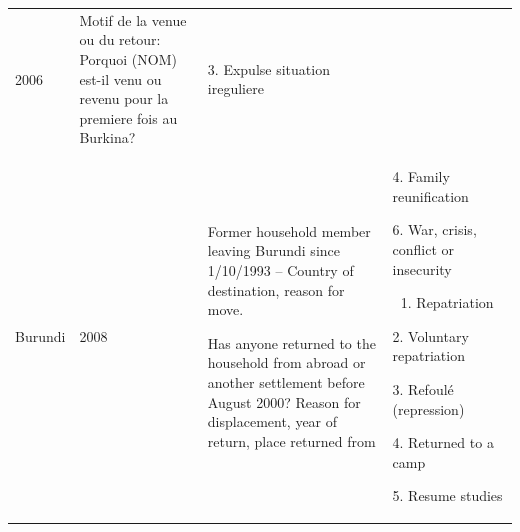 \documentclass[
]{article}
\providecommand{\tightlist}{%
  \setlength{\itemsep}{0pt}\setlength{\parskip}{0pt}}
\begin{document}
\begin{longtable}[]{@{}llll@{}}
\begin{minipage}[t]{0.22\columnwidth}
2006\strut
\end{minipage} & \begin{minipage}[t]{0.22\columnwidth}\raggedright
Motif de la
venue ou du
retour: Porquoi
(NOM) est-il
venu ou revenu
pour la
premiere fois
au Burkina?\strut
\end{minipage} & \begin{minipage}[t]{0.22\columnwidth}\raggedright
3. Expulse
situation
ireguliere\strut
\end{minipage}\tabularnewline
\begin{minipage}[t]{0.22\columnwidth}\raggedright
Burundi\strut
\end{minipage} & \begin{minipage}[t]{0.22\columnwidth}\raggedright
2008\strut
\end{minipage} & \begin{minipage}[t]{0.22\columnwidth}\raggedright
Former
household
member leaving
Burundi since
1/10/1993 --
Country of
destination,
reason for
move.

Has anyone
returned to the
household from
abroad or
another
settlement
before August
2000? Reason
for
displacement,
year of return,
place returned
from\strut
\end{minipage} & \begin{minipage}[t]{0.22\columnwidth}\raggedright
4. Family
reunification

6. War,
crisis,
conflict or
insecurity

\begin{enumerate}
\def\labelenumi{\arabic{enumi}.}
\tightlist
\item
  Repatriation
\end{enumerate}

2. Voluntary
repatriation

3. Refoulé
(repression)

4. Returned
to a camp

5. Resume
studies


\end{minipage}
\end{longtable}
\end{document}
